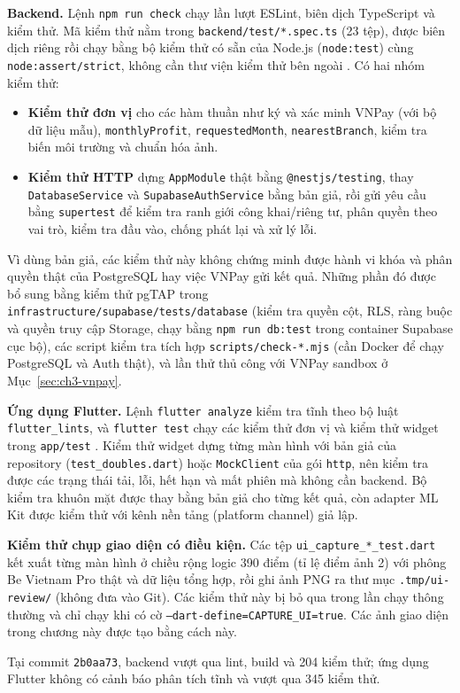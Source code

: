 \textbf{Backend.} Lệnh \texttt{npm run check} chạy lần lượt ESLint, biên dịch TypeScript và kiểm thử. Mã kiểm thử nằm trong \texttt{backend/\allowbreak{}test/\allowbreak{}*.\allowbreak{}spec.\allowbreak{}ts} (23 tệp), được biên dịch riêng rồi chạy bằng bộ kiểm thử có sẵn của Node.js (\texttt{node:test}) cùng \texttt{node:assert/\allowbreak{}strict}, không cần thư viện kiểm thử bên ngoài \parencite{ch3-node-test}. Có hai nhóm kiểm thử:
\begin{itemize}
	\item \textbf{Kiểm thử đơn vị} cho các hàm thuần như ký và xác minh VNPay (với bộ dữ liệu mẫu), \texttt{monthlyProfit}, \texttt{requested\allowbreak{}Month}, \texttt{nearestBranch}, kiểm tra biến môi trường và chuẩn hóa ảnh.
	\item \textbf{Kiểm thử HTTP} dựng \texttt{AppModule} thật bằng \texttt{@nestjs/\allowbreak{}testing}, thay \texttt{Database\allowbreak{}Service} và \texttt{Supabase\allowbreak{}Auth\allowbreak{}Service} bằng bản giả, rồi gửi yêu cầu bằng \texttt{supertest} để kiểm tra ranh giới công khai/riêng tư, phân quyền theo vai trò, kiểm tra đầu vào, chống phát lại và xử lý lỗi.
\end{itemize}
Vì dùng bản giả, các kiểm thử này không chứng minh được hành vi khóa và phân quyền thật của PostgreSQL hay việc VNPay gửi kết quả. Những phần đó được bổ sung bằng kiểm thử pgTAP trong \texttt{infrastructure/\allowbreak{}supabase/\allowbreak{}tests/\allowbreak{}database} (kiểm tra quyền cột, RLS, ràng buộc và quyền truy cập Storage, chạy bằng \texttt{npm run db:test} trong container Supabase cục bộ), các script kiểm tra tích hợp \texttt{scripts/\allowbreak{}check-*.\allowbreak{}mjs} (cần Docker để chạy PostgreSQL và Auth thật), và lần thử thủ công với VNPay sandbox ở Mục~\ref{sec:ch3-vnpay}.

\textbf{Ứng dụng Flutter.} Lệnh \texttt{flutter analyze} kiểm tra tĩnh theo bộ luật \texttt{flutter\_\allowbreak{}lints}, và \texttt{flutter test} chạy các kiểm thử đơn vị và kiểm thử widget trong \texttt{app/\allowbreak{}test} \parencite{ch3-flutter-testing}. Kiểm thử widget dựng từng màn hình với bản giả của repository (\texttt{test\_\allowbreak{}doubles.\allowbreak{}dart}) hoặc \texttt{MockClient} của gói \texttt{http}, nên kiểm tra được các trạng thái tải, lỗi, hết hạn và mất phiên mà không cần backend. Bộ kiểm tra khuôn mặt được thay bằng bản giả cho từng kết quả, còn adapter ML Kit được kiểm thử với kênh nền tảng (platform channel) giả lập.

\textbf{Kiểm thử chụp giao diện có điều kiện.} Các tệp \texttt{ui\_\allowbreak{}capture\_\allowbreak{}*\_\allowbreak{}test.\allowbreak{}dart} kết xuất từng màn hình ở chiều rộng logic 390 điểm (tỉ lệ điểm ảnh 2) với phông Be Vietnam Pro thật và dữ liệu tổng hợp, rồi ghi ảnh PNG ra thư mục \texttt{.\allowbreak{}tmp/\allowbreak{}ui-\allowbreak{}review/} (không đưa vào Git). Các kiểm thử này bị bỏ qua trong lần chạy thông thường và chỉ chạy khi có cờ \texttt{--dart-\allowbreak{}define=CAPTURE\_\allowbreak{}UI=true}. Các ảnh giao diện trong chương này được tạo bằng cách này.

Tại commit \texttt{2b0aa73}, backend vượt qua lint, build và 204 kiểm thử; ứng dụng Flutter không có cảnh báo phân tích tĩnh và vượt qua 345 kiểm thử.
